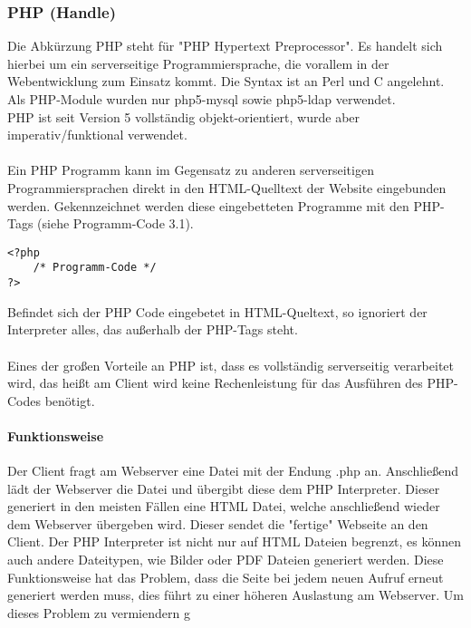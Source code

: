 \subsubsection{PHP (Handle)}
Die Abkürzung PHP steht für "PHP Hypertext Preprocessor". Es handelt sich hierbei um ein serverseitige Programmiersprache, die vorallem in der Webentwicklung zum Einsatz kommt. Die Syntax ist an Perl und C angelehnt.\\
Als PHP-Module wurden nur php5-mysql sowie php5-ldap verwendet.\\
PHP ist seit Version 5 vollständig objekt-orientiert, wurde aber imperativ/funktional verwendet.\\
\\
Ein PHP Programm kann im Gegensatz zu anderen serverseitigen Programmiersprachen direkt in den HTML-Quelltext der Website eingebunden werden. Gekennzeichnet werden diese eingebetteten Programme mit den PHP-Tags (siehe Programm-Code 3.1).\\
\begin{lstlisting}[style=customPHP, caption={PHP-Tags}]
<?php 
	/* Programm-Code */
?>
\end{lstlisting}
Befindet sich der PHP Code eingebetet in HTML-Queltext, so ignoriert der Interpreter alles, das außerhalb der PHP-Tags steht.\\\\
Eines der großen Vorteile an PHP ist, dass es vollständig serverseitig verarbeitet wird, das heißt am Client wird keine Rechenleistung für das Ausführen des PHP-Codes benötigt.
\paragraph{Funktionsweise}
Der Client fragt am Webserver eine Datei mit der Endung .php an. Anschließend lädt der Webserver die Datei und übergibt diese dem PHP Interpreter. Dieser generiert in den meisten Fällen eine HTML Datei, welche anschließend wieder dem Webserver übergeben wird. Dieser sendet die "fertige" Webseite an den Client. Der PHP Interpreter ist nicht nur auf HTML Dateien begrenzt, es können auch andere Dateitypen, wie Bilder oder PDF Dateien generiert werden. Diese Funktionsweise hat das Problem, dass die Seite bei jedem neuen Aufruf erneut generiert werden muss, dies führt zu einer höheren Auslastung am Webserver. Um dieses Problem zu vermiendern g
